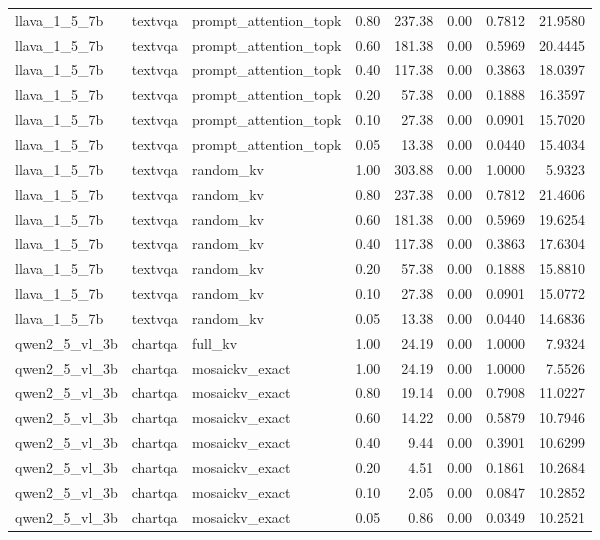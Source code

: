 \begin{longtable}{lllrrrrr}
llava\_1\_5\_7b & textvqa & prompt\_attention\_topk & 0.80 & 237.38 & 0.00 & 0.7812 & 21.9580 \\
llava\_1\_5\_7b & textvqa & prompt\_attention\_topk & 0.60 & 181.38 & 0.00 & 0.5969 & 20.4445 \\
llava\_1\_5\_7b & textvqa & prompt\_attention\_topk & 0.40 & 117.38 & 0.00 & 0.3863 & 18.0397 \\
llava\_1\_5\_7b & textvqa & prompt\_attention\_topk & 0.20 & 57.38 & 0.00 & 0.1888 & 16.3597 \\
llava\_1\_5\_7b & textvqa & prompt\_attention\_topk & 0.10 & 27.38 & 0.00 & 0.0901 & 15.7020 \\
llava\_1\_5\_7b & textvqa & prompt\_attention\_topk & 0.05 & 13.38 & 0.00 & 0.0440 & 15.4034 \\
llava\_1\_5\_7b & textvqa & random\_kv & 1.00 & 303.88 & 0.00 & 1.0000 & 5.9323 \\
llava\_1\_5\_7b & textvqa & random\_kv & 0.80 & 237.38 & 0.00 & 0.7812 & 21.4606 \\
llava\_1\_5\_7b & textvqa & random\_kv & 0.60 & 181.38 & 0.00 & 0.5969 & 19.6254 \\
llava\_1\_5\_7b & textvqa & random\_kv & 0.40 & 117.38 & 0.00 & 0.3863 & 17.6304 \\
llava\_1\_5\_7b & textvqa & random\_kv & 0.20 & 57.38 & 0.00 & 0.1888 & 15.8810 \\
llava\_1\_5\_7b & textvqa & random\_kv & 0.10 & 27.38 & 0.00 & 0.0901 & 15.0772 \\
llava\_1\_5\_7b & textvqa & random\_kv & 0.05 & 13.38 & 0.00 & 0.0440 & 14.6836 \\
qwen2\_5\_vl\_3b & chartqa & full\_kv & 1.00 & 24.19 & 0.00 & 1.0000 & 7.9324 \\
qwen2\_5\_vl\_3b & chartqa & mosaickv\_exact & 1.00 & 24.19 & 0.00 & 1.0000 & 7.5526 \\
qwen2\_5\_vl\_3b & chartqa & mosaickv\_exact & 0.80 & 19.14 & 0.00 & 0.7908 & 11.0227 \\
qwen2\_5\_vl\_3b & chartqa & mosaickv\_exact & 0.60 & 14.22 & 0.00 & 0.5879 & 10.7946 \\
qwen2\_5\_vl\_3b & chartqa & mosaickv\_exact & 0.40 & 9.44 & 0.00 & 0.3901 & 10.6299 \\
qwen2\_5\_vl\_3b & chartqa & mosaickv\_exact & 0.20 & 4.51 & 0.00 & 0.1861 & 10.2684 \\
qwen2\_5\_vl\_3b & chartqa & mosaickv\_exact & 0.10 & 2.05 & 0.00 & 0.0847 & 10.2852 \\
qwen2\_5\_vl\_3b & chartqa & mosaickv\_exact & 0.05 & 0.86 & 0.00 & 0.0349 & 10.2521 \\

\end{longtable}
